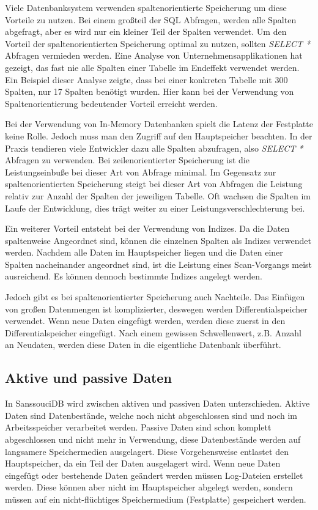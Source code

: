 \documentclass[draft,final]{vutinfth} %
\begin{document}
Viele Datenbanksystem verwenden spaltenorientierte Speicherung um diese Vorteile zu nutzen. Bei einem gro{\ss}teil der SQL Abfragen, werden alle Spalten abgefragt, aber es wird nur ein kleiner Teil der Spalten verwendet. Um den Vorteil der spaltenorientierten Speicherung optimal zu nutzen, sollten \textit{SELECT *} Abfragen vermieden werden. Eine Analyse von Unternehmensapplikationen hat gezeigt, das fast nie alle Spalten einer Tabelle im Endeffekt verwendet werden. Ein Beispiel dieser Analyse zeigte, dass bei einer konkreten Tabelle mit 300 Spalten, nur 17 Spalten benötigt wurden. Hier kann bei der Verwendung von Spaltenorientierung bedeutender Vorteil erreicht werden.

Bei der Verwendung von In-Memory Datenbanken spielt die Latenz der Festplatte keine Rolle. Jedoch muss man den Zugriff auf den Hauptspeicher beachten. In der Praxis tendieren viele Entwickler dazu alle Spalten abzufragen, also \textit{SELECT *} Abfragen zu verwenden. Bei zeilenorientierter Speicherung ist die Leistungseinbu\ss e bei dieser Art von Abfrage minimal. Im Gegensatz zur spaltenorientierten Speicherung steigt bei dieser Art von Abfragen die Leistung relativ zur Anzahl der Spalten der jeweiligen Tabelle. Oft wachsen die Spalten im Laufe der Entwicklung, dies trägt weiter zu einer Leistungsverschlechterung bei.

Ein weiterer Vorteil entsteht bei der Verwendung von Indizes. Da die Daten spaltenweise Angeordnet sind, können die einzelnen Spalten als Indizes verwendet werden. Nachdem alle Daten im Hauptspeicher liegen und die Daten einer Spalten nacheinander angeordnet sind, ist die Leistung eines Scan-Vorgangs meist ausreichend. Es können dennoch bestimmte Indizes angelegt werden.

Jedoch gibt es bei spaltenorientierter Speicherung auch Nachteile. Das Einfügen von gro\ss en Datenmengen ist komplizierter, deswegen werden Differentialspeicher verwendet. Wenn neue Daten eingefügt werden, werden diese zuerst in den Differentialspeicher eingefügt. Nach einem gewissen Schwellenwert, z.B. Anzahl an Neudaten, werden diese Daten in die eigentliche Datenbank überführt.


\subsection{Aktive und passive Daten}
In SanssouciDB wird zwischen aktiven und passiven Daten unterschieden. Aktive Daten sind Datenbestände, welche noch nicht abgeschlossen sind und noch im Arbeitsspeicher verarbeitet werden. Passive Daten sind schon komplett abgeschlossen und nicht mehr in Verwendung, diese Datenbestände werden auf langsamere Speichermedien ausgelagert. Diese Vorgehensweise entlastet den Hauptspeicher, da ein Teil der Daten ausgelagert wird. Wenn neue Daten eingefügt oder bestehende Daten geändert werden müssen Log-Dateien erstellet werden. Diese können aber nicht im Hauptspeicher abgelegt werden, sondern müssen auf ein nicht-flüchtiges Speichermedium (Festplatte) gespeichert werden.
\end{document}
